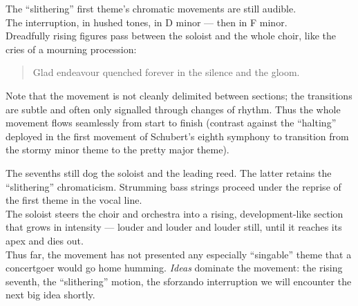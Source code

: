 \documentclass{beamer}
\begin{document}
\begin{frame}
  The ``slithering'' first theme's chromatic movements are still audible. 
  \pause \\ 
  The interruption, in hushed tones, in D minor --- \pause then in F minor. 
  \pause \\ 
  Dreadfully rising figures pass between the soloist and the whole choir, like the cries of a mourning procession: 
  \pause 
  \begin{quote} %
    G{\pause}l{\pause}a{\pause}d{\pause} e{\pause}n{\pause}d{\pause}e{\pause}a{\pause}v{\pause}o{\pause}u{\pause}r{\pause} q{\pause}u{\pause}e{\pause}n{\pause}c{\pause}h{\pause}e{\pause}d{\pause} f{\pause}o{\pause}r{\pause}e{\pause}v{\pause}e{\pause}r{\pause} i{\pause}n{\pause} t{\pause}h{\pause}e{\pause} s{\pause}i{\pause}l{\pause}e{\pause}n{\pause}c{\pause}e{\pause} a{\pause}n{\pause}d{\pause} t{\pause}h{\pause}e{\pause} g{\pause}l{\pause}o{\pause}o{\pause}m{\pause}. 
  \end{quote} 
\end{frame} 

\begin{frame}
  Note that the movement is not cleanly delimited between sections; the transitions are subtle and often only signalled through changes of rhythm. Thus the whole movement flows seamlessly from start to finish (contrast against the ``halting'' deployed in the first movement of Schubert's eighth symphony to transition from the stormy minor theme to the pretty major theme). 
\end{frame} 

\begin{frame}
  The sevenths still dog the soloist and the leading reed. The latter retains the ``slithering'' chromaticism. Strumming bass strings proceed under the reprise of the first theme in the vocal line. 
  \pause \\ 
  The soloist steers the choir and orchestra into a rising, development-like section that grows in intensity --- louder and louder and louder still, until it reaches its apex and dies out. 
  \pause \\ 
  Thus far, the movement has not presented any especially ``singable'' theme that a concertgoer would go home humming. \emph{Ideas} dominate the movement: the rising seventh, the ``slithering'' motion, the sforzando interruption \textellipsis we will encounter the next big idea shortly. 
\end{frame} 
\end{document}
